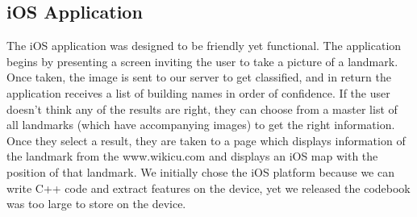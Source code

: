 \subsection{iOS Application}
The iOS application was designed to be friendly yet functional. The application begins by presenting a screen inviting the user to take a picture of a landmark. Once taken, the image is sent to our server to get classified, and in return the application receives a list of building names in order of confidence. If the user doesn't think any of the results are right, they can choose from a master list of all landmarks (which have accompanying images) to get the right information. Once they select a result, they are taken to a page which displays information of the landmark from the www.wikicu.com and displays an iOS map with the position of that landmark. We initially chose the iOS platform because we can write C++ code and extract features on the device, yet we released the codebook was too large to store on the device.